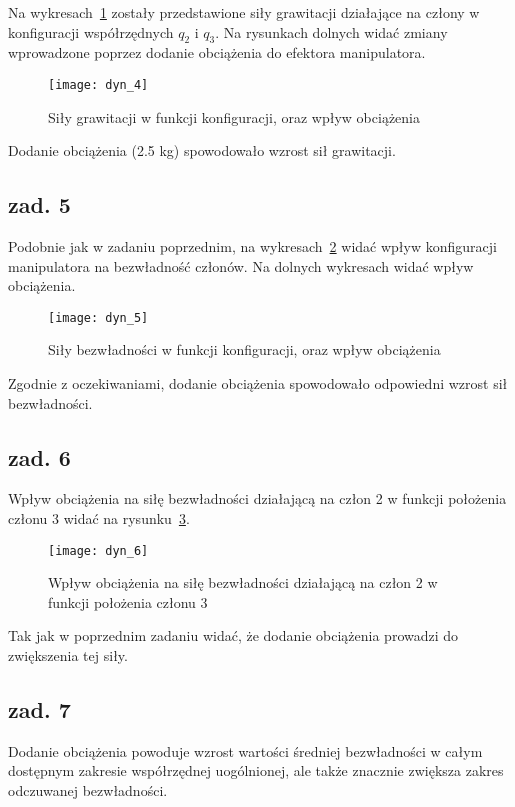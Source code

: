 \documentclass[11pt, a4paper]{article}
\begin{document}
Na wykresach~\ref{fig:dyn_4} zostały przedstawione siły grawitacji działające na człony w konfiguracji współrzędnych $q_2$ i $q_3$. Na rysunkach dolnych widać zmiany wprowadzone poprzez dodanie obciążenia do efektora manipulatora.
\begin{figure}[htbp!]
	\centering
	\texttt{[image: dyn\_4]}
	\caption{Siły grawitacji w funkcji konfiguracji, oraz wpływ obciążenia \label{fig:dyn_4}}
\end{figure}

Dodanie obciążenia (2.5 kg) spowodowało wzrost sił grawitacji.

\subsection*{zad. 5}

Podobnie jak w zadaniu poprzednim, na wykresach~\ref{fig:dyn_5} widać wpływ konfiguracji manipulatora na bezwładność członów. Na dolnych wykresach widać wpływ obciążenia.
\begin{figure}[htbp!]
	\centering
	\texttt{[image: dyn\_5]}
	\caption{Siły bezwładności w funkcji konfiguracji, oraz wpływ obciążenia \label{fig:dyn_5}}
\end{figure}

Zgodnie z oczekiwaniami, dodanie obciążenia spowodowało odpowiedni wzrost sił bezwładności.

\subsection*{zad. 6}

Wpływ obciążenia na siłę bezwładności działającą na człon 2 w funkcji położenia członu 3 widać na rysunku~\ref{fig:dyn_6}.
\begin{figure}[htbp!]
	\centering
	\texttt{[image: dyn\_6]}
	\caption{Wpływ obciążenia na siłę bezwładności działającą na człon 2 w funkcji położenia członu 3 \label{fig:dyn_6}}
\end{figure}

Tak jak w poprzednim zadaniu widać, że dodanie obciążenia prowadzi do zwiększenia tej siły.

\subsection*{zad. 7}

Dodanie obciążenia powoduje wzrost wartości średniej bezwładności w całym dostępnym zakresie współrzędnej uogólnionej, ale także znacznie zwiększa zakres odczuwanej bezwładności.
\end{document}

